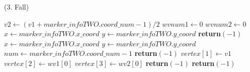 \begin{algorithm}[!ht]\small
\caption{ (3. Fall)}
\label{alg:checksquare-6}
\begin{algorithmic}[1]
		\State $\mathit{v2} \gets (\mathit{v1} + \mathit{marker\_infoTWO.coord\_num} - 1) / 2$
		\label{alg:checksquare-6-v2}
		\State $\mathit{wvnum1} \gets 0$
		\State $\mathit{wvnum2} \gets 0$
		\State $x \gets \mathit{marker\_infoTWO.x\_coord}$
		\State $y \gets \mathit{marker\_infoTWO.y\_coord}$
		\label{alg:checksquare-6-vertex1}
			\State \textbf{return}$(-1)$
		\EndIf
		\State $x \gets \mathit{marker\_infoTWO.x\_coord}$
		\State $y \gets \mathit{marker\_infoTWO.y\_coord}$
		\State $\mathit{num} \gets \mathit{marker\_infoTWO.coord\_num} - 1$
		\label{alg:checksquare-6-vertex2}
			\State \textbf{return}$(-1)$
		\EndIf
			\State $\mathit{vertex}[1] \gets \mathit{v1}$
			\State $\mathit{vertex}[2] \gets \mathit{wv1}[0]$
			\State $\mathit{vertex}[3] \gets \mathit{wv2}[0]$
		\Else
			\State \textbf{return}$(-1)$
		\EndIf
	\Else
		\State \textbf{return}$(-1)$
	\EndIf
\end{algorithmic}
\end{algorithm}
